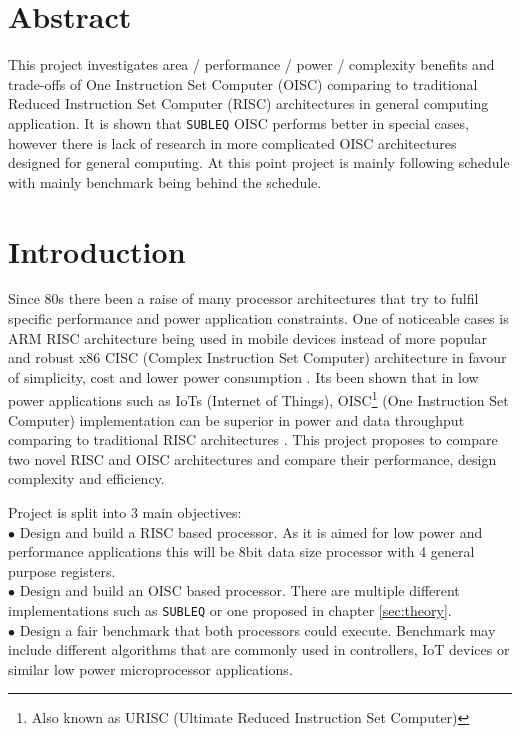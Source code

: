 \documentclass[a4paper,12pt]{article}
\begin{document}
\pagebreak

\begin{multicols}{2}

\section{Abstract}
This project investigates area / performance / power / complexity benefits and trade-offs of One Instruction Set Computer (OISC) comparing to traditional Reduced Instruction Set Computer (RISC) architectures in general computing application. It is shown that \texttt{SUBLEQ} OISC performs better in special cases, however there is lack of research in more complicated OISC architectures designed for general computing. At this point project is mainly following schedule with mainly benchmark being behind the schedule.

\section{Introduction}
Since 80s there been a raise of many processor architectures that try to fulfil specific performance and power application constraints. One of noticeable cases is ARM RISC  architecture being used in mobile devices instead of more popular and robust x86 CISC (Complex Instruction Set Computer) architecture in favour of simplicity, cost and lower power consumption \autocite{jamil_1995,blem_menon_sankaralingam_2013}. Its been shown that in low power applications such as IoTs (Internet of Things), OISC\footnote{Also known as URISC (Ultimate Reduced Instruction Set Computer)} (One Instruction Set Computer) implementation can be superior in power and data throughput comparing to traditional RISC architectures \autocite{yokota_saso_hara-azumi_2017, ahmed_sakamoto_anderson_hara-azumi_2015}. This project proposes to compare two novel RISC and OISC architectures and compare their performance, design complexity and efficiency.

Project is split into 3 main objectives:\\
$\bullet$ Design and build a RISC based processor. As it is aimed for low power and performance applications this will be 8bit data size processor with 4 general purpose registers.\\
$\bullet$ Design and build an OISC based processor. There are multiple different implementations such as \texttt{SUBLEQ} or one proposed in chapter \ref{sec:theory}.\\
$\bullet$ Design a fair benchmark that both processors could execute. Benchmark may include different algorithms that are commonly used in controllers, IoT devices or similar low power microprocessor applications.


\end{multicols}
\end{document}
